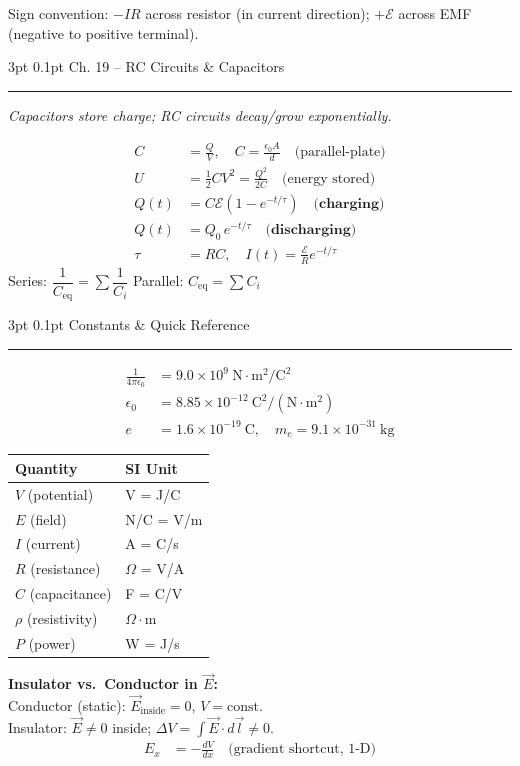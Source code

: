 \documentclass[10pt,twocolumn]{article}
\makeatletter
\renewcommand{\section}{\@startsection{section}{1}{\z@}%
  {3pt \@plus 1pt \@minus 1pt}%
  {0.1pt}%
  {\small\bfseries\color{blue!70!black}}}
\newcommand{\mysection}[1]{%
  \section{#1}%
  \noindent\textcolor{blue!50!black}{\rule{\linewidth}{0.4pt}}\vspace{1pt}%
}
\newcommand{\sn}[2]{#1\times10^{#2}}
\newenvironment{eqbox}{%
  \begin{mdframed}[linewidth=0.5pt,innerleftmargin=3pt,innerrightmargin=3pt,
    innertopmargin=2pt,innerbottommargin=2pt,backgroundcolor=blue!4]
  \small
}{%
  \end{mdframed}\vspace{1pt}
}
\makeatother
\begin{document}
Sign convention: $-IR$ across resistor (in current direction); $+\mathcal{E}$ across EMF (negative to positive terminal).

\mysection{Ch. 19 -- RC Circuits \& Capacitors}

\textit{Capacitors store charge; RC circuits decay/grow exponentially.}

\begin{eqbox}
\begin{align*}
  C &= \frac{Q}{V}, \quad C = \frac{\epsilon_0 A}{d} \quad \text{(parallel-plate)}\\
  U &= \tfrac{1}{2}CV^2 = \tfrac{Q^2}{2C} \quad \text{(energy stored)}\\
  Q(t) &= C\mathcal{E}\!\left(1-e^{-t/\tau}\right) \quad \textbf{(charging)}\\
  Q(t) &= Q_0\,e^{-t/\tau} \quad \textbf{(discharging)}\\
  \tau &= RC, \quad I(t) = \frac{\mathcal{E}}{R}e^{-t/\tau}
\end{align*}
Series: $\dfrac{1}{C_{\text{eq}}}=\sum\dfrac{1}{C_i}$ \quad Parallel: $C_{\text{eq}}=\sum C_i$
\end{eqbox}

\mysection{Constants \& Quick Reference}

\begin{eqbox}
\begin{align*}
  \frac{1}{4\pi\epsilon_0} &= \sn{9.0}{9}\ \mathrm{N\cdot m^2/C^2}\\
  \epsilon_0 &= \sn{8.85}{-12}\ \mathrm{C^2/(N\cdot m^2)}\\
  e &= \sn{1.6}{-19}\ \mathrm{C}, \quad m_e=\sn{9.1}{-31}\ \mathrm{kg}
\end{align*}
\end{eqbox}

\begin{center}
\small
\begin{tabular}{ll}
\toprule
Quantity & SI Unit \\
\midrule
$V$ (potential) & V = J/C \\
$E$ (field) & N/C = V/m \\
$I$ (current) & A = C/s \\
$R$ (resistance) & $\Omega$ = V/A \\
$C$ (capacitance) & F = C/V \\
$\rho$ (resistivity) & $\Omega\cdot$m \\
$P$ (power) & W = J/s \\
\bottomrule
\end{tabular}
\end{center}

\vspace{2pt}
\textbf{Insulator vs.\ Conductor in $\vec{E}$:}\\
Conductor (static): $\vec{E}_{\text{inside}}=0$, $V=\text{const}$.\\
Insulator: $\vec{E}\neq 0$ inside; $\Delta V = \int \vec{E}\cdot d\vec{l} \neq 0$.
\begin{align*}
  E_x &= -\frac{dV}{dx} \quad \text{(gradient shortcut, 1-D)}
\end{align*}
\end{document}
